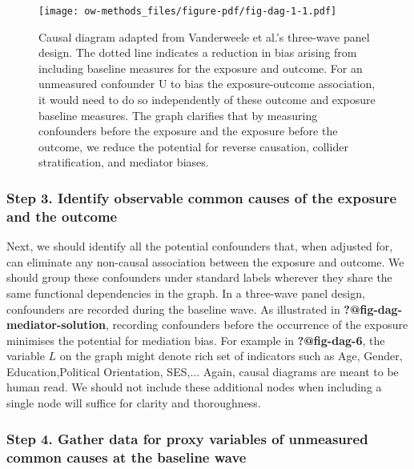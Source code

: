 \documentclass[
  singlecolumn]{article}
\begin{document}
\begin{figure}

{\centering \texttt{[image: ow-methods\_files/figure-pdf/fig-dag-1-1.pdf]}

}

\caption{\label{fig-dag-1}Causal diagram adapted from Vanderweele et
al.'s three-wave panel design. The dotted line indicates a reduction in
bias arising from including baseline measures for the exposure and
outcome. For an unmeasured confounder U to bias the exposure-outcome
association, it would need to do so independently of these outcome and
exposure baseline measures. The graph clarifies that by measuring
confounders before the exposure and the exposure before the outcome, we
reduce the potential for reverse causation, collider stratification, and
mediator biases.}

\end{figure}

\hypertarget{step-3.-identify-observable-common-causes-of-the-exposure-and-the-outcome}{%
\subsubsection{Step 3. Identify observable common causes of the exposure
and the
outcome}\label{step-3.-identify-observable-common-causes-of-the-exposure-and-the-outcome}}

Next, we should identify all the potential confounders that, when
adjusted for, can eliminate any non-causal association between the
exposure and outcome. We should group these confounders under standard
labels wherever they share the same functional dependencies in the
graph. In a three-wave panel design, confounders are recorded during the
baseline wave. As illustrated in \textbf{?@fig-dag-mediator-solution},
recording confounders before the occurrence of the exposure minimises
the potential for mediation bias. For example in \textbf{?@fig-dag-6},
the variable \(L\) on the graph might denote rich set of indicators such
as Age, Gender, Education,Political Orientation, SES,\(\dots\) Again,
causal diagrams are meant to be human read. We should not include these
additional nodes when including a single node will suffice for clarity
and thoroughness.

\hypertarget{step-4.-gather-data-for-proxy-variables-of-unmeasured-common-causes-at-the-baseline-wave}{%
\subsubsection{Step 4. Gather data for proxy variables of unmeasured
common causes at the baseline
wave}\label{step-4.-gather-data-for-proxy-variables-of-unmeasured-common-causes-at-the-baseline-wave}}
\end{document}
